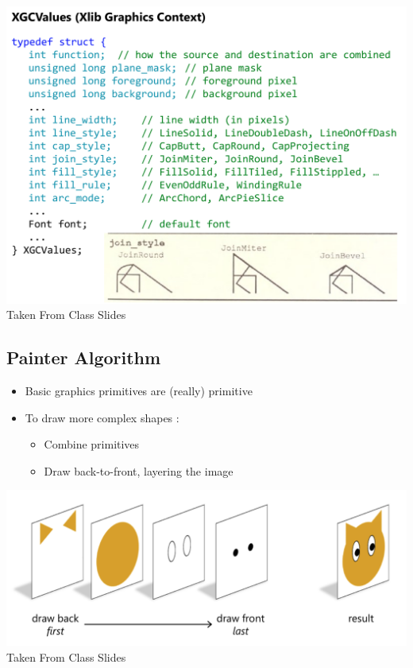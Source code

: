 \documentclass[twoside]{article}
\begin{document}
\begin{center}
\includegraphics[scale=0.2]{4}\\
Taken From Class Slides
\end{center}

\subsection{Painter Algorithm}
\begin{itemize}
\item Basic graphics primitives are (really) primitive
\item To draw more complex shapes : 
\begin{itemize}
\item Combine primitives
\item Draw back-to-front, layering the image
\end{itemize}
\end{itemize}

\begin{center}
\includegraphics[scale=0.2]{5}\\
Taken From Class Slides
\end{center}
\end{document}
